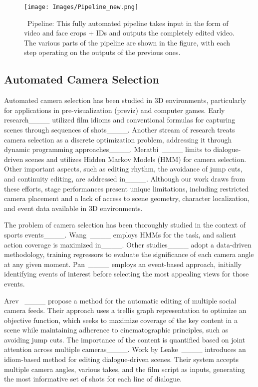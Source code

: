\begin{figure*}[t]
\centering
\texttt{[image: Images/Pipeline\_new.png]}
\caption{\ourmethod~Pipeline: This fully automated pipeline takes input in the form of video and face crops + IDs and outputs the completely edited video. The various parts of the pipeline are shown in the figure, with each step operating on the outputs of the previous ones.}
\label{fig:pipeline}
\end{figure*}

\subsection{Automated Camera Selection}

Automated camera selection has been studied in 3D environments, particularly for applications in pre-visualization (previz) and computer games. Early research____ utilized film idioms and conventional formulas for capturing scenes through sequences of shots____. Another stream of research treats camera selection as a discrete optimization problem, addressing it through dynamic programming approaches____. Meratbi~\etal____ limits to dialogue-driven scenes and utilizes Hidden Markov Models (HMM) for camera selection. Other important aspects, such as editing rhythm, the avoidance of jump cuts, and continuity editing, are addressed in____. Although our work draws from these efforts, stage performances present unique limitations, including restricted camera placement and a lack of access to scene geometry, character localization, and event data available in 3D environments.


The problem of camera selection has been thoroughly studied in the context of sports events____. Wang~\etal____ employs HMMs for the task, and salient action coverage is maximized in____. Other studies____ adopt a data-driven methodology, training regressors to evaluate the significance of each camera angle at any given moment. Pan~\etal____ employs an event-based approach, initially identifying events of interest before selecting the most appealing views for those events.

Arev ~\etal____ propose a method for the automatic editing of multiple social camera feeds. Their approach uses a trellis graph representation to optimize an objective function, which seeks to maximize coverage of the key content in a scene while maintaining adherence to cinematographic principles, such as avoiding jump cuts. The importance of the content is quantified based on joint attention across multiple cameras____. Work by Leake~\etal____ introduces an idiom-based method for editing dialogue-driven scenes. Their system accepts multiple camera angles, various takes, and the film script as inputs, generating the most informative set of shots for each line of dialogue. 


